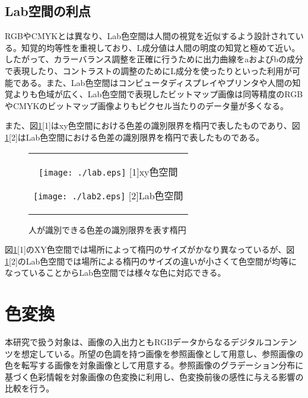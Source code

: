 \subsection{Lab空間の利点}
RGBやCMYKとは異なり、Lab色空間は人間の視覚を近似するよう設計されている。知覚的均等性を重視しており、L成分値は人間の明度の知覚と極めて近い。したがって、カラーバランス調整を正確に行うために出力曲線をaおよびbの成分で表現したり、コントラストの調整のためにL成分を使ったりといった利用が可能である。また、Lab色空間はコンピュータディスプレイやプリンタや人間の知覚よりも色域が広く、Lab色空間で表現したビットマップ画像は同等精度のRGBやCMYKのビットマップ画像よりもピクセル当たりのデータ量が多くなる。\par
また、図\ref{fig:lab2}[1]はxy色空間における色差の識別限界を楕円で表したものであり、図\ref{fig:lab2}[2]はLab色空間における色差の識別限界を楕円で表したものである。\par
\begin{figure}[htbp]
  \begin{center}
    \begin{tabular}{c}

      \begin{minipage}{0.33\hsize}
        \begin{center}
          \texttt{[image: ./lab.eps]}
          \hspace{1.6cm} [1]xy色空間
        \end{center}
      \end{minipage}

      \begin{minipage}{0.33\hsize}
        \begin{center}
          \texttt{[image: ./lab2.eps]}
          \hspace{1.6cm} [2]Lab色空間
        \end{center}
      \end{minipage}

    \end{tabular}
    \caption{人が識別できる色差の識別限界を表す楕円}
    \label{fig:lab2}
  \end{center}
\end{figure}
図\ref{fig:lab2}[1]のXY色空間では場所によって楕円のサイズがかなり異なっているが、図\ref{fig:lab2}[2]のLab色空間では場所による楕円のサイズの違いが小さくて色空間が均等になっていることからLab色空間では様々な色に対応できる。
\newpage
\section{色変換}
本研究で扱う対象は、画像の入出力ともRGBデータからなるデジタルコンテンツを想定している。所望の色調を持つ画像を参照画像として用意し、参照画像の色を転写する画像を対象画像として用意する。参照画像のグラデーション分布に基づく色彩情報を対象画像の色変換に利用し、色変換前後の感性に与える影響の比較を行う。


